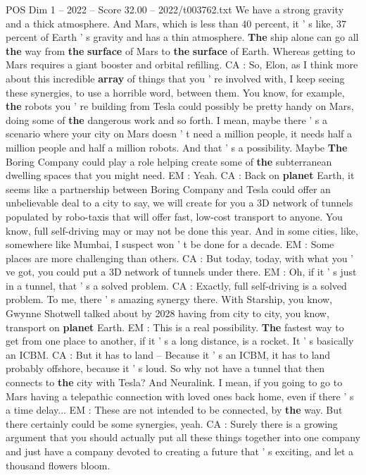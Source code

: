\begin{textsample}{POS Dim 1 – 2022 – Score 32.00 – 2022/t003762.txt}
We have a strong gravity and a thick atmosphere.
And Mars, which is less than 40 percent, it ' s like, 37 percent of Earth ' s gravity and has a thin atmosphere. \textbf{The} ship alone can go all \textbf{the} way from \textbf{the} \textbf{surface} of Mars to \textbf{the} \textbf{surface} of Earth.
Whereas getting to Mars requires a giant booster and orbital refilling.
CA : So, Elon, as I think more about this incredible \textbf{array} of things that you ' re involved with, I keep seeing these synergies, to use a horrible word, between them.
You know, for example, \textbf{the} robots you ' re building from Tesla could possibly be pretty handy on Mars, doing some of \textbf{the} dangerous work and so forth.
I mean, maybe there ' s a scenario where your city on Mars doesn ' t need a million people, it needs half a million people and half a million robots.
And that ' s a possibility.
Maybe \textbf{The} Boring Company could play a role helping create some of \textbf{the} subterranean dwelling spaces that you might need.
EM : Yeah.
CA : Back on \textbf{planet} Earth, it seems like a partnership between Boring Company and Tesla could offer an unbelievable deal to a city to say, we will create for you a 3D network of tunnels populated by robo-taxis that will offer fast, low-cost transport to anyone.
You know, full self-driving may or may not be done this year.
And in some cities, like, somewhere like Mumbai, I suspect won ' t be done for a decade.
EM : Some places are more challenging than others.
CA : But today, today, with what you ' ve got, you could put a 3D network of tunnels under there.
EM : Oh, if it ' s just in a tunnel, that ' s a solved problem.
CA : Exactly, full self-driving is a solved problem.
To me, there ' s amazing synergy there.
With Starship, you know, Gwynne Shotwell talked about by 2028 having from city to city, you know, transport on \textbf{planet} Earth.
EM : This is a real possibility. \textbf{The} fastest way to get from one place to another, if it ' s a long distance, is a rocket.
It ' s basically an ICBM.
CA : But it has to land -- Because it ' s an ICBM, it has to land probably offshore, because it ' s loud.
So why not have a tunnel that then connects to \textbf{the} city with Tesla?
And Neuralink.
I mean, if you going to go to Mars having a telepathic connection with loved ones back home, even if there ' s a time delay...
EM : These are not intended to be connected, by \textbf{the} way.
But there certainly could be some synergies, yeah.
CA : Surely there is a growing argument that you should actually put all these things together into one company and just have a company devoted to creating a future that ' s exciting, and let a thousand flowers bloom.

\end{textsample}
